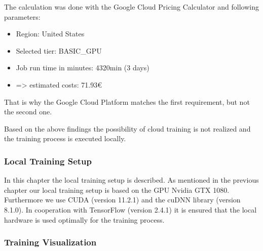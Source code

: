 The calculation was done with the Google Cloud Pricing Calculator \cite{googleeditorGoogleCloudPlatformPreisrechner} and following parameters:
\begin{itemize}
	\item Region: United States
	\item Selected tier: BASIC\_GPU
	\item Job run time in minutes: 4320min (3 days)
	\item => estimated costs: 71.93€
\end{itemize}

That is why the Google Cloud Platform matches the first requirement, but not the second one.

Based on the above findings the possibility of cloud training is not realized and the training process is executed locally. 

\subsubsection{Local Training Setup}
\label{ch:approachBg}

In this chapter the local training setup is described. As mentioned in the previous chapter our local training  setup is based on the GPU Nvidia GTX 1080. Furthermore we use CUDA (version 11.2.1) and the cuDNN library (version 8.1.0). In cooperation with TensorFlow (version 2.4.1) it is ensured that the local hardware is used optimally for the training process.


\subsubsection{Training Visualization}
\label{ch:approachBh}